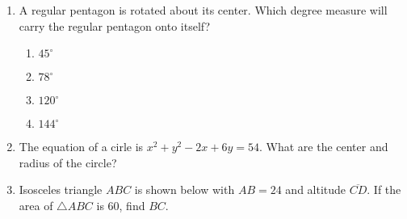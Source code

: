 \documentclass[12pt, oneside]{article}
\begin{document}
\begin{enumerate}[itemsep=2cm]
\item A regular pentagon is rotated about its center. Which degree measure will carry the regular pentagon onto itself? 
\begin{multicols}{2}
  \begin{enumerate}
    \item $45^\circ$
    \item $78^\circ$
    \item $120^\circ$
    \item $144^\circ$
  \end{enumerate}
\end{multicols}
  
\item The equation of a cirle is $x^2+y^2-2x+6y=54$. What are the center and radius of the circle?

\item Isosceles triangle $ABC$ is shown below with $AB=24$ and altitude $\overline{CD}$. If the area of $\triangle ABC$ is 60, find $BC$.
  \begin{center}
  \end{center}

\end{enumerate}
\end{document}
